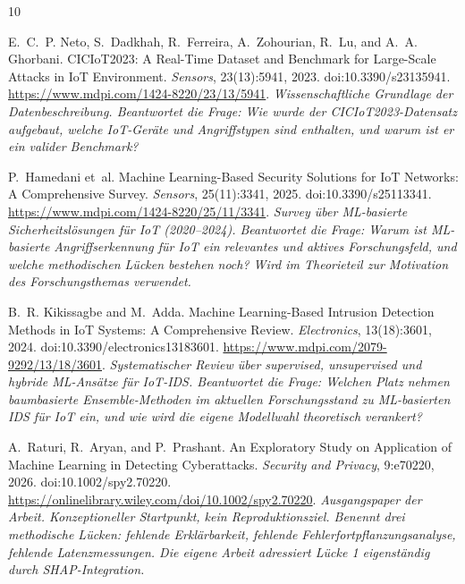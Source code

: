 \documentclass[letterpaper,twocolumn,10pt]{article}
\begin{document}
\begin{thebibliography}{10}

E.~C.~P. Neto, S.~Dadkhah, R.~Ferreira, A.~Zohourian, R.~Lu, and
  A.~A. Ghorbani.
\newblock CICIoT2023: A Real-Time Dataset and Benchmark for Large-Scale
  Attacks in IoT Environment.
\newblock \emph{Sensors}, 23(13):5941, 2023. doi:10.3390/s23135941.
  \url{https://www.mdpi.com/1424-8220/23/13/5941}.
\newblock \textit{Wissenschaftliche Grundlage der Datenbeschreibung.
  Beantwortet die Frage: Wie wurde der CICIoT2023-Datensatz aufgebaut,
  welche IoT-Geräte und Angriffstypen sind enthalten, und warum ist er
  ein valider Benchmark?}

P.~Hamedani et~al.
\newblock Machine Learning-Based Security Solutions for IoT Networks:
  A Comprehensive Survey.
\newblock \emph{Sensors}, 25(11):3341, 2025. doi:10.3390/s25113341.
  \url{https://www.mdpi.com/1424-8220/25/11/3341}.
\newblock \textit{Survey über ML-basierte Sicherheitslösungen für IoT
  (2020--2024). Beantwortet die Frage: Warum ist ML-basierte
  Angriffserkennung für IoT ein relevantes und aktives Forschungsfeld,
  und welche methodischen Lücken bestehen noch? Wird im Theorieteil zur
  Motivation des Forschungsthemas verwendet.}

B.~R. Kikissagbe and M.~Adda.
\newblock Machine Learning-Based Intrusion Detection Methods in IoT
  Systems: A Comprehensive Review.
\newblock \emph{Electronics}, 13(18):3601, 2024.
  doi:10.3390/electronics13183601.
  \url{https://www.mdpi.com/2079-9292/13/18/3601}.
\newblock \textit{Systematischer Review über supervised, unsupervised
  und hybride ML-Ansätze für IoT-IDS. Beantwortet die Frage: Welchen
  Platz nehmen baumbasierte Ensemble-Methoden im aktuellen
  Forschungsstand zu ML-basierten IDS für IoT ein, und wie wird die
  eigene Modellwahl theoretisch verankert?}

A.~Raturi, R.~Aryan, and P.~Prashant.
\newblock An Exploratory Study on Application of Machine Learning in
  Detecting Cyberattacks.
\newblock \emph{Security and Privacy}, 9:e70220, 2026.
  doi:10.1002/spy2.70220.
  \url{https://onlinelibrary.wiley.com/doi/10.1002/spy2.70220}.
\newblock \textit{Ausgangspaper der Arbeit. Konzeptioneller Startpunkt,
  kein Reproduktionsziel. Benennt drei methodische Lücken: fehlende
  Erklärbarkeit, fehlende Fehlerfortpflanzungsanalyse, fehlende
  Latenzmessungen. Die eigene Arbeit adressiert Lücke 1 eigenständig
  durch SHAP-Integration.}


\end{thebibliography}
\end{document}
